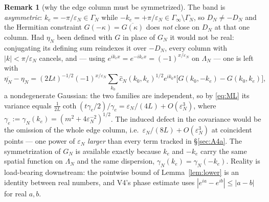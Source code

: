 \documentclass[11pt,a4paper]{article}
\theoremstyle{plain}
\theoremstyle{definition}
\newtheorem*{remarknn}{Remark}
\newcommand{\eps}{\varepsilon}
\DeclareMathOperator{\cth}{coth}
\begin{document}
\begin{remarknn}[why the edge column must be symmetrized]
The band is \emph{asymmetric}: $k_e=-\pi/\eps_N\in\Gamma_N$ while
$-k_e=+\pi/\eps_N\in\Gamma_\infty\setminus\Gamma_N$, so $D_N\ne-D_N$ and the Hermitian
constraint $G(-\kappa)=\overline{G(\kappa)}$ does \emph{not} close on $D_N$ at that one
column. Had $\eta_N$ been defined with $G$ in place of $G_N$ it would not be real:
conjugating its defining sum reindexes it over $-D_N$, every column with
$|k|<\pi/\eps_N$ cancels, and --- using $e^{ik_ex}=e^{-ik_ex}=(-1)^{x/\eps_N}$ on
$\Lambda_N$ --- one is left with
\[
 \overline{\eta_N}-\eta_N=(2Lt)^{-1/2}(-1)^{x/\eps_N}\sum_{k_0}
 \hat c_N(k_0,k_e)^{1/2}e^{ik_0s}\bigl[G(k_0,-k_e)-G(k_0,k_e)\bigr],
\]
a nondegenerate Gaussian: the two families are independent, so by \eqref{eq:ML} its
variance equals $\frac1{2L}\cth(t\gamma_e/2)/\gamma_e=\eps_N/(4L)+O(\eps_N^3)$, where
$\gamma_e:=\gamma_N(k_e)=(m^2+4\eps_N^{-2})^{1/2}$. The induced defect in the covariance
would be the omission of the whole edge column, i.e.\ $\eps_N/(8L)+O(\eps_N^3)$ at
coincident points --- one power of $\eps_N$ \emph{larger} than every term tracked in
\S\ref{sec:A4a}. The symmetrization of $G_N$ is available exactly because $k_e$ and
$-k_e$ carry the same spatial function on $\Lambda_N$ and the same dispersion,
$\gamma_N(k_e)=\gamma_N(-k_e)$. Reality is load-bearing downstream: the pointwise bound
of Lemma~\ref{lem:lower} is an identity between real numbers, and V4's phase estimate
uses $|e^{ia}-e^{ib}|\le|a-b|$ for real $a,b$.
\end{remarknn}
\end{document}
